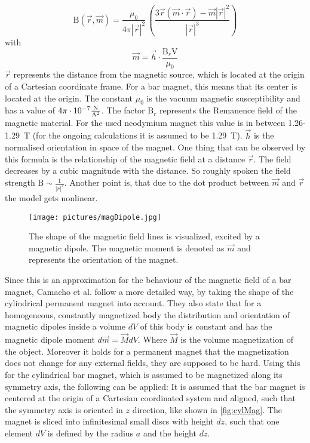 \begin{equation} \label{eq:dipole}
\mathrm{B}(\vec{r},\vec{m}) = 
\frac{\mu_{0}}{4 \pi |\vec{r}|^{2}} \, \left (\frac{3 \vec{r} (\vec{m} \cdot \vec{r}) - \vec{m}|\vec{r}|^{2} }{|\vec{r}|^3} \right)						
\end{equation}
with 
\begin{equation*} \label{eq:magMoment}
\vec{m} = \vec{h} \cdot \frac{\mathrm{B}_r \mathrm{V}}{\mu_{0}}
\end{equation*}
$ \vec{r} $ represents the distance from the magnetic source, which is located at the origin of a Cartesian coordinate frame. For a bar magnet, this means that its center is located at the origin. The constant $ \mu_{0} $ is the vacuum magnetic susceptibility \cite{camacho2013alternative} and has a value of $ 4 \pi \cdot 10^{-7}\si[per-mode=fraction]{\newton \per \ampere \squared}$. The factor $ \mathrm{B}_r $ represents the Remanence field of the magnetic material. For the used neodymium magnet this value is in between \mbox{1.26-\SI{1.29}{\tesla}} (for the ongoing calculations it is assumed to be \SI{1.29}{\tesla}). $ \vec{h} $ is the normalised orientation in space of the magnet. One thing that can be observed by this formula is the relationship of the magnetic field at a distance $ \vec{r} $. The field decreases by a cubic magnitude with the distance. So roughly spoken the field strength $ \mathrm{B} \sim \frac{1}{|r|^ {3}}$. Another point is, that due to the dot product between $ \vec{m} $ and $ \vec{r} $ the model gets nonlinear.\\
\begin{figure}[!htb]
\centering
\texttt{[image: pictures/magDipole.jpg]}
\caption[Magnetic field lines, excited by a dipole.]
{The shape of the magnetic field lines is visualized, excited by a magnetic dipole. The magnetic moment is denoted as $ \vec{m} $ and represents the orientation of the magnet.}
\label{fig:magDipole}
\end{figure}
Since this is an approximation for the behaviour of the magnetic field of a bar magnet, Camacho et al. \cite{camacho2013alternative} follow a more detailed way, by taking the shape of the cylindrical permanent magnet into account. They also state that for a homogeneous, constantly magnetized body the distribution and orientation of magnetic dipoles inside a volume $ dV $ of this body is constant and has the magnetic dipole moment $ d\vec{m} = \vec{M}dV $. Where $ \vec{M} $ is the volume magnetization of the object. Moreover it holds for a permanent magnet that the magnetization does not change for any external fields, they are supposed to be hard. Using this for the cylindrical bar magnet, which is assumed to be magnetized along its symmetry axis, the following can be applied: It is assumed that the bar magnet is centered at the origin of a Cartesian coordinated system and aligned, such that the symmetry axis is oriented in $ z $ direction, like shown in \ref{fig:cylMag}. The magnet is sliced into infinitesimal small discs with height $ dz $, such that one element $ dV $ is defined by the radius $ a $ and the height $ dz $. 
